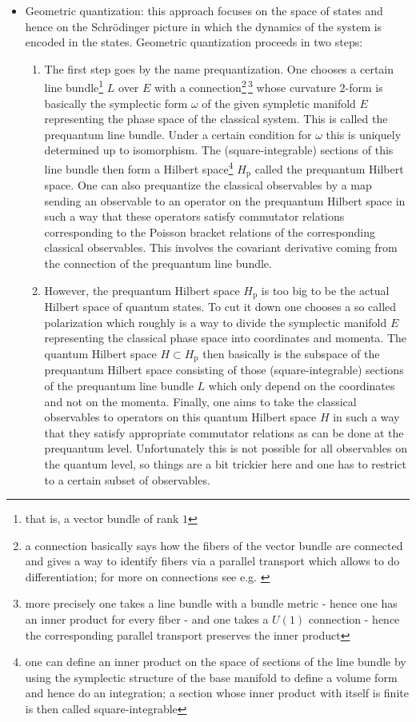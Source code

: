 \begin{itemize}
\item
Geometric quantization: this approach focuses on the space of states and hence on the Schr{\"o}dinger picture in which the dynamics of the system is encoded in the states. Geometric quantization proceeds in two steps:
\begin{enumerate}
\item
The first step goes by the name prequantization. One chooses a certain line bundle\footnote{that is, a vector bundle of rank $1$} $L$ over $E$ with a connection\footnote{a connection basically says how the fibers of the vector bundle are connected and gives a way to identify fibers via a parallel transport which allows to do differentiation; for more on connections see e.g. \cite{00000001}}\,\footnote{more precisely one takes a line bundle with a bundle metric - hence one has an inner product for every fiber - and one takes a $U(1)$ connection - hence the corresponding parallel transport preserves the inner product} whose curvature $2$-form is basically the symplectic form $\omega$ of the given sympletic manifold $E$ representing the phase space of the classical system. This is called the prequantum line bundle. Under a certain condition for $\omega$ this is uniquely determined up to isomorphism. The (square-integrable) sections of this line bundle then form a Hilbert space\footnote{one can define an inner product on the space of sections of the line bundle by using the symplectic structure of the base manifold to define a volume form and hence do an integration; a section whose inner product with itself is finite is then called square-integrable} $H_{\textrm{p}}$ called the prequantum Hilbert space. One can also prequantize the classical observables by a map sending an observable to an operator on the prequantum Hilbert space in such a way that these operators satisfy commutator relations corresponding to the Poisson bracket relations of the corresponding classical observables. This involves the covariant derivative coming from the connection of the prequantum line bundle.

\item
However, the prequantum Hilbert space $H_{\textrm{p}}$ is too big to be the actual Hilbert space of quantum states. To cut it down one chooses a so called polarization which roughly is a way to divide the symplectic manifold $E$ representing the classical phase space into {\glqq}coordinates{\grqq} and {\glqq}momenta{\grqq}. The quantum Hilbert space $H \subset H_{\textrm{p}}$ then basically is the subspace of the prequantum Hilbert space consisting of those (square-integrable) sections of the prequantum line bundle $L$ which only depend on the coordinates and not on the momenta. Finally, one aims to take the classical observables to operators on this quantum Hilbert space $H$ in such a way that they satisfy appropriate commutator relations as can be done at the prequantum level. Unfortunately this is not possible for all observables on the quantum level, so things are a bit trickier here and one has to restrict to a certain subset of observables.
\end{enumerate}
\end{itemize}
